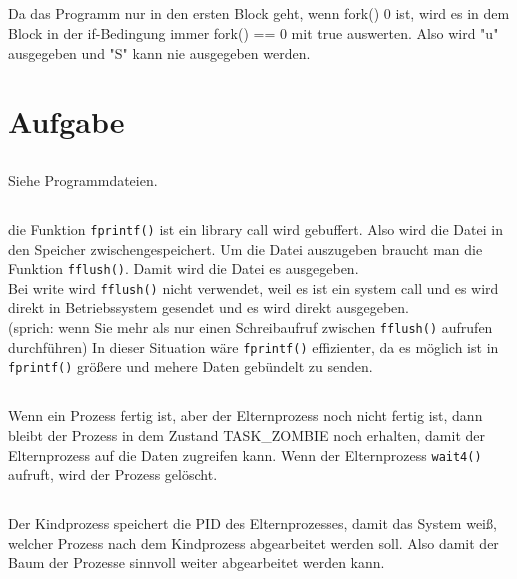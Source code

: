 \documentclass{scrartcl}
\begin{document}
\subsection{}
Da das Programm nur in den ersten Block geht, wenn fork() 0 ist, wird es in dem Block in der if-Bedingung immer fork() == 0 mit true auswerten. Also wird "u" ausgegeben und "S" kann nie ausgegeben werden.

\section{Aufgabe}

\subsection{}

Siehe Programmdateien.

\subsection{}

die Funktion \texttt{fprintf()} ist ein library call wird gebuffert. Also wird die Datei in den Speicher zwischengespeichert. Um die Datei auszugeben braucht man die Funktion \texttt{fflush()}. Damit wird die Datei es ausgegeben. \\
Bei write wird \texttt{fflush()} nicht verwendet, weil es ist ein system call und es wird direkt in Betriebssystem gesendet und es wird direkt ausgegeben. \\
(sprich: wenn Sie mehr als nur einen Schreibaufruf zwischen \texttt{fflush()} aufrufen durchführen)
In dieser Situation wäre \texttt{fprintf()} effizienter, da es möglich ist in \texttt{fprintf()} größere und mehere Daten gebündelt zu senden.

\subsection{}

Wenn ein Prozess fertig ist, aber der Elternprozess noch nicht fertig ist, dann bleibt der Prozess in dem Zustand TASK\_ZOMBIE noch erhalten, damit der Elternprozess auf die Daten zugreifen kann. Wenn der Elternprozess \texttt{wait4()} aufruft, wird der Prozess gelöscht.

\subsection{}

Der Kindprozess speichert die PID des Elternprozesses, damit das System weiß, welcher Prozess nach dem Kindprozess abgearbeitet werden soll. Also damit der Baum der Prozesse sinnvoll weiter abgearbeitet werden kann.
\end{document}
